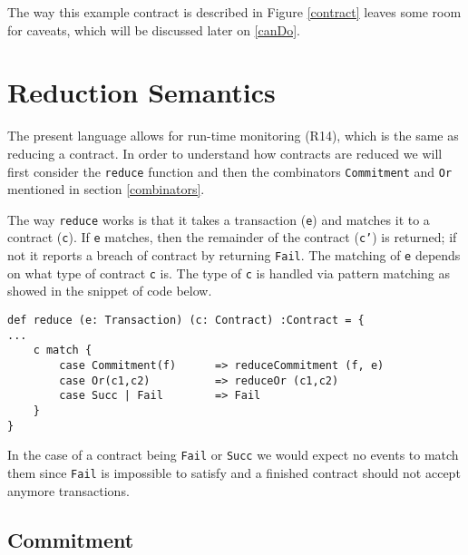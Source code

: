 \documentclass{ituthesis}
\begin{document}
The way this example contract is described in Figure \ref{contract} leaves some room for caveats, which will be discussed later on \ref{canDo}.

\section{Reduction Semantics} \label{reduction}

The present language allows for run-time monitoring (R14), which is the same as reducing a contract. In order to understand how contracts are reduced we will first consider the \texttt{reduce} function and then the combinators \texttt{Commitment} and \texttt{Or} mentioned in section \ref{combinators}.

The way \texttt{reduce} works is that it takes a transaction (\texttt{e}) and matches it to a contract (\texttt{c}). If \texttt{e} matches, then the remainder of the contract (\texttt{c'}) is returned; if not it reports a breach of contract by returning \texttt{Fail}. The matching of \texttt{e} depends on what type of contract \texttt{c} is. The type of \texttt{c} is handled via pattern matching as showed in the snippet of code below.
\begin{lstlisting}
def reduce (e: Transaction) (c: Contract) :Contract = { 
...
    c match {
        case Commitment(f)      => reduceCommitment (f, e)
        case Or(c1,c2)          => reduceOr (c1,c2)
        case Succ | Fail        => Fail
    }
}
\end{lstlisting}
In the case of a contract being \texttt{Fail} or \texttt{Succ} we would expect no events to match them since \texttt{Fail} is impossible to satisfy and a finished contract should not accept anymore transactions.

\subsection{Commitment}
\end{document}
